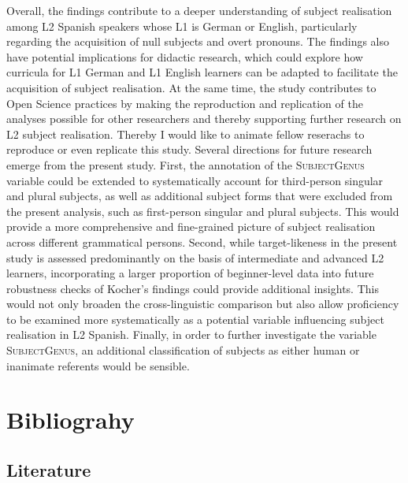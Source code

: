 \documentclass[
  letterpaper,
  DIV=11,
  numbers=noendperiod]{scrartcl}
\begin{document}
Overall, the findings contribute to a deeper understanding of subject
realisation among L2 Spanish speakers whose L1 is German or English,
particularly regarding the acquisition of null subjects and overt
pronouns. The findings also have potential implications for didactic
research, which could explore how curricula for L1 German and L1 English
learners can be adapted to facilitate the acquisition of subject
realisation. At the same time, the study contributes to Open Science
practices by making the reproduction and replication of the analyses
possible for other researchers and thereby supporting further research
on L2 subject realisation. Thereby I would like to animate fellow
reserachs to reproduce or even replicate this study. Several directions
for future research emerge from the present study. First, the annotation
of the \textsc{SubjectGenus} variable could be extended to
systematically account for third-person singular and plural subjects, as
well as additional subject forms that were excluded from the present
analysis, such as first-person singular and plural subjects. This would
provide a more comprehensive and fine-grained picture of subject
realisation across different grammatical persons. Second, while
target-likeness in the present study is assessed predominantly on the
basis of intermediate and advanced L2 learners, incorporating a larger
proportion of beginner-level data into future robustness checks of
Kocher's findings could provide additional insights. This would not only
broaden the cross-linguistic comparison but also allow proficiency to be
examined more systematically as a potential variable influencing subject
realisation in L2 Spanish. Finally, in order to further investigate the
variable \textsc{SubjectGenus}, an additional classification of subjects
as either human or inanimate referents would be sensible.

\newpage{}

\section{Bibliograhy}\label{bibliograhy}

\subsection{Literature}\label{literature}
\end{document}
